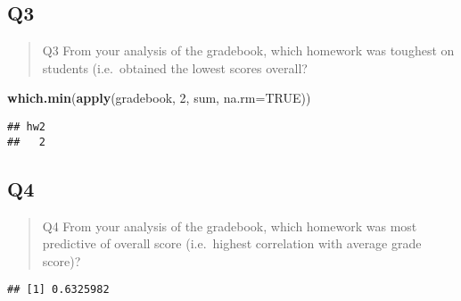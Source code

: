 \documentclass[
]{article}
\newenvironment{Shaded}{\begin{snugshade}}{\end{snugshade}}
\newcommand{\DataTypeTok}[1]{\textcolor[rgb]{0.13,0.29,0.53}{#1}}
\newcommand{\DecValTok}[1]{\textcolor[rgb]{0.00,0.00,0.81}{#1}}
\newcommand{\KeywordTok}[1]{\textcolor[rgb]{0.13,0.29,0.53}{\textbf{#1}}}
\newcommand{\NormalTok}[1]{#1}
\newcommand{\OperatorTok}[1]{\textcolor[rgb]{0.81,0.36,0.00}{\textbf{#1}}}
\newcommand{\OtherTok}[1]{\textcolor[rgb]{0.56,0.35,0.01}{#1}}
\newcommand{\StringTok}[1]{\textcolor[rgb]{0.31,0.60,0.02}{#1}}
\begin{document}
\hypertarget{q3}{%
\subsection{Q3}\label{q3}}

\begin{quote}
Q3 From your analysis of the gradebook, which homework was toughest on
students (i.e.~obtained the lowest scores overall?
\end{quote}

\begin{Shaded}
\begin{Highlighting}[]
\KeywordTok{which.min}\NormalTok{(}\KeywordTok{apply}\NormalTok{(gradebook, }\DecValTok{2}\NormalTok{, sum, }\DataTypeTok{na.rm=}\OtherTok{TRUE}\NormalTok{))}
\end{Highlighting}
\end{Shaded}

\begin{verbatim}
## hw2 
##   2
\end{verbatim}

\hypertarget{q4}{%
\subsection{Q4}\label{q4}}

\begin{quote}
Q4 From your analysis of the gradebook, which homework was most
predictive of overall score (i.e.~highest correlation with average grade
score)?
\end{quote}

\begin{Shaded}
\end{Shaded}

\begin{verbatim}
## [1] 0.6325982
\end{verbatim}

\begin{Shaded}
\end{Shaded}
\end{document}
